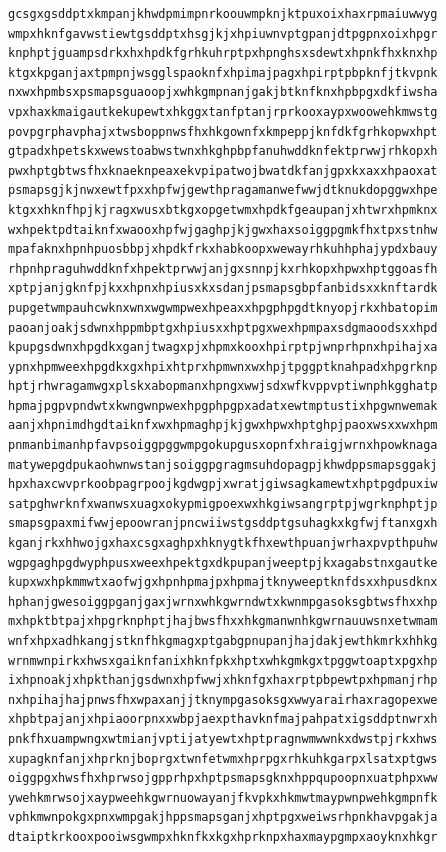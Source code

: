 \documentclass[11pt,letterpaper]{exam}
\begin{document}
\begin{questions}
\begin{verbatim}
gcsgxgsddptxkmpanjkhwdpmimpnrkoouwmpknjktpuxoixhaxrpmaiuwwyg
wmpxhknfgavwstiewtgsddptxhsgjkjxhpiuwnvptgpanjdtpgpnxoixhpgr
knphptjguampsdrkxhxhpdkfgrhkuhrptpxhpnghsxsdewtxhpnkfhxknxhp
ktgxkpganjaxtpmpnjwsgglspaoknfxhpimajpagxhpirptpbpknfjtkvpnk
nxwxhpmbsxpsmapsguaoopjxwhkgmpnanjgakjbtknfknxhpbpgxdkfiwsha
vpxhaxkmaigautkekupewtxhkggxtanfptanjrprkooxaypxwoowehkmwstg
povpgrphavphajxtwsboppnwsfhxhkgownfxkmpeppjknfdkfgrhkopwxhpt
gtpadxhpetskxwewstoabwstwnxhkghpbpfanuhwddknfektprwwjrhkopxh
pwxhptgbtwsfhxknaeknpeaxekvpipatwojbwatdkfanjgpxkxaxxhpaoxat
psmapsgjkjnwxewtfpxxhpfwjgewthpragamanwefwwjdtknukdopggwxhpe
ktgxxhknfhpjkjragxwusxbtkgxopgetwmxhpdkfgeaupanjxhtwrxhpmknx
wxhpektpdtaiknfxwaooxhpfwjgaghpjkjgwxhaxsoiggpgmkfhxtpxstnhw
mpafaknxhpnhpuosbbpjxhpdkfrkxhabkoopxwewayrhkuhhphajypdxbauy
rhpnhpraguhwddknfxhpektprwwjanjgxsnnpjkxrhkopxhpwxhptggoasfh
xptpjanjgknfpjkxxhpnxhpiusxkxsdanjpsmapsgbpfanbidsxxknftardk
pupgetwmpauhcwknxwnxwgwmpwexhpeaxxhpgphpgdtknyopjrkxhbatopim
paoanjoakjsdwnxhppmbptgxhpiusxxhptpgxwexhpmpaxsdgmaoodsxxhpd
kpupgsdwnxhpgdkxganjtwagxpjxhpmxkooxhpirptpjwnprhpnxhpihajxa
ypnxhpmweexhpgdkxgxhpixhtprxhpmwnxwxhpjtpggptknahpadxhpgrknp
hptjrhwragamwgxplskxabopmanxhpngxwwjsdxwfkvppvptiwnphkgghatp
hpmajpgpvpndwtxkwngwnpwexhpgphpgpxadatxewtmptustixhpgwnwemak
aanjxhpnimdhgdtaiknfxwxhpmaghpjkjgwxhpwxhptghpjpaoxwsxxwxhpm
pnmanbimanhpfavpsoiggpggwmpgokupgusxopnfxhraigjwrnxhpowknaga
matywepgdpukaohwnwstanjsoiggpgragmsuhdopagpjkhwdppsmapsggakj
hpxhaxcwvprkoobpagrpoojkgdwgpjxwratjgiwsagkamewtxhptpgdpuxiw
satpghwrknfxwanwsxuagxokypmigpoexwxhkgiwsangrptpjwgrknphptjp
smapsgpaxmifwwjepoowranjpncwiiwstgsddptgsuhagkxkgfwjftanxgxh
kganjrkxhhwojgxhaxcsgxaghpxhknygtkfhxewthpuanjwrhaxpvpthpuhw
wgpgaghpgdwyphpusxweexhpektgxdkpupanjweeptpjkxagabstnxgautke
kupxwxhpkmmwtxaofwjgxhpnhpmajpxhpmajtknyweeptknfdsxxhpusdknx
hphanjgwesoiggpganjgaxjwrnxwhkgwrndwtxkwnmpgasoksgbtwsfhxxhp
mxhpktbtpajxhpgrknphptjhajbwsfhxxhkgmanwnhkgwrnauuwsnxetwmam
wnfxhpxadhkangjstknfhkgmagxptgabgpnupanjhajdakjewthkmrkxhhkg
wrnmwnpirkxhwsxgaiknfanixhknfpkxhptxwhkgmkgxtpggwtoaptxpgxhp
ixhpnoakjxhpkthanjgsdwnxhpfwwjxhknfgxhaxrptpbpewtpxhpmanjrhp
nxhpihajhajpnwsfhxwpaxanjjtknympgasoksgxwwyarairhaxragopexwe
xhpbtpajanjxhpiaoorpnxxwbpjaexpthavknfmajpahpatxigsddptnwrxh
pnkfhxuampwngxwtmianjvptijatyewtxhptpragnwmwwnkxdwstpjrkxhws
xupagknfanjxhprknjboprgxtwnfetwmxhprpgxrhkuhkgarpxlsatxptgws
oiggpgxhwsfhxhprwsojgpprhpxhptpsmapsgknxhppqupoopnxuatphpxww
ywehkmrwsojxaypweehkgwrnuowayanjfkvpkxhkmwtmaypwnpwehkgmpnfk
vphkmwnpokgxpnxwmpgakjhppsmapsganjxhptpgxweiwsrhpnkhavpgakja
dtaiptkrkooxpooiwsgwmpxhknfkxkgxhprknpxhaxmaypgmpxaoyknxhkgr

\end{verbatim}
\end{questions}
\end{document}
